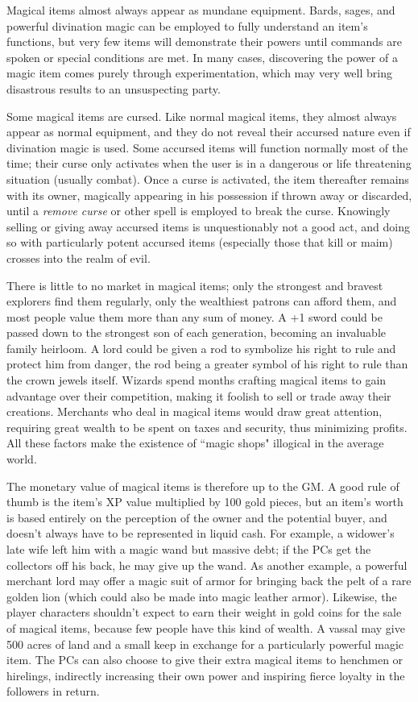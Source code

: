 \begin{multicols}{2}
Magical items almost always appear as mundane equipment.  Bards, sages, and powerful divination magic can be employed to fully understand an item's functions, but very few items will demonstrate their powers until commands are spoken or special conditions are met.  In many cases, discovering the power of a magic item comes purely through experimentation, which may very well bring disastrous results to an unsuspecting party.

Some magical items are cursed.  Like normal magical items, they almost always appear as normal equipment, and they do not reveal their accursed nature even if divination magic is used.  Some accursed items will function normally most of the time; their curse only activates when the user is in a dangerous or life threatening situation (usually combat).  Once a curse is activated, the item thereafter remains with its owner, magically appearing in his possession if thrown away or discarded, until a \textit{remove curse} or other spell is employed to break the curse.  Knowingly selling or giving away accursed items is unquestionably not a good act, and doing so with particularly potent accursed items (especially those that kill or maim) crosses into the realm of evil.

There is little to no market in magical items; only the strongest and bravest explorers find them regularly, only the wealthiest patrons can afford them, and most people value them more than any sum of money.  A +1 sword could be passed down to the strongest son of each generation, becoming an invaluable family heirloom.  A lord could be given a rod to symbolize his right to rule and protect him from danger, the rod being a greater symbol of his right to rule than the crown jewels itself.  Wizards spend months crafting magical items to gain advantage over their competition, making it foolish to sell or trade away their creations.  Merchants who deal in magical items would draw great attention, requiring great wealth to be spent on taxes and security, thus minimizing profits.  All these factors make the existence of ``magic shops" illogical in the average world.

The monetary value of magical items is therefore up to the GM.  A good rule of thumb is the item's XP value multiplied by 100 gold pieces, but an item's worth is based entirely on the perception of the owner and the potential buyer, and doesn't always have to be represented in liquid cash.  For example, a widower's late wife left him with a magic wand but massive debt; if the PCs get the collectors off his back, he may give up the wand. As another example, a powerful merchant lord may offer a magic suit of armor for bringing back the pelt of a rare golden lion (which could also be made into magic leather armor).  Likewise, the player characters shouldn't expect to earn their weight in gold coins for the sale of magical items, because few people have this kind of wealth.  A vassal may give 500 acres of land and a small keep in exchange for a particularly powerful magic item.  The PCs can also choose to give their extra magical items to henchmen or hirelings, indirectly increasing their own power and inspiring fierce loyalty in the followers in return.


\end{multicols}

